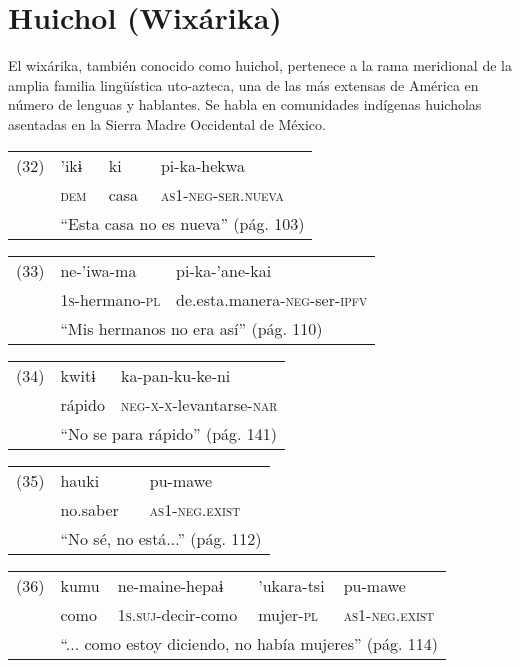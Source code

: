 \section*{Huichol (Wixárika)}

\noindent El wixárika, también conocido como huichol, pertenece a la rama meridional de la amplia familia lingüística uto-azteca, una de las más extensas de América en número de lenguas y hablantes. Se habla en comunidades indígenas huicholas asentadas en la Sierra Madre Occidental de México. \vspace{0.5cm}

{\setmainfont{Doulos SIL} 
\begin{tabular}{llll}
(32) & 'ikɨ & ki & pi-ka-hekwa \\
& \textsc{dem} & casa & \textsc{as1-neg-ser.nueva} \\
& \multicolumn{3}{l}{``Esta casa no es nueva'' (pág. 103)}
\end{tabular} \vspace{0.5cm}

\begin{tabular}{lll}
(33) & ne-'iwa-ma & pi-ka-'ane-kai \\
& \textsc{1s}-hermano-\textsc{pl} & de.esta.manera-\textsc{neg}-ser-\textsc{ipfv} \\
& \multicolumn{2}{l}{``Mis hermanos no era así'' (pág. 110)}
\end{tabular} \vspace{0.3cm}

\begin{tabular}{lll}
(34) & kwitɨ & ka-pan-ku-ke-ni \\
& rápido & \textsc{neg-x-x}-levantarse-\textsc{nar} \\
& \multicolumn{2}{l}{``No se para rápido'' (pág. 141)}
\end{tabular} \vspace{0.3cm}

\begin{tabular}{lll}
(35) & hauki & pu-mawe \\
& no.saber & \textsc{as1-neg.exist} \\
& \multicolumn{2}{l}{``No sé, no está...'' (pág. 112)}
\end{tabular} \vspace{0.3cm}

\begin{tabular}{lllll}
(36) & kumu & ne-maine-hepaɨ & 'ukara-tsi & pu-mawe \\
& como & \textsc{1s.suj}-decir-como & mujer-\textsc{pl} & \textsc{as1-neg.exist} \\
& \multicolumn{4}{l}{``... como estoy diciendo, no había mujeres'' (pág. 114)}
\end{tabular} \vspace{0.3cm}
}

